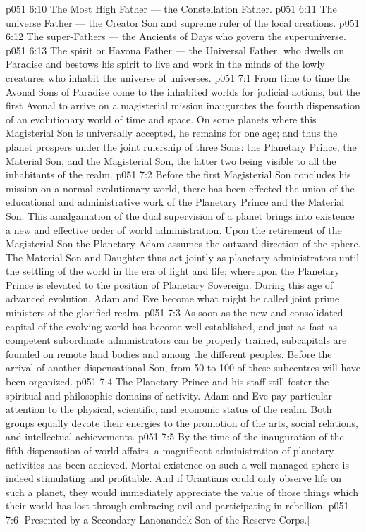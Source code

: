 \vs p051 6:10 \bibnobreakspace The Most High Father --- the Constellation Father.
\vs p051 6:11 \bibnobreakspace The universe Father --- the Creator Son and supreme ruler of the local creations.
\vs p051 6:12 \bibnobreakspace The super\hyp{}Fathers --- the Ancients of Days who govern the superuniverse.
\vs p051 6:13 \bibnobreakspace The spirit or Havona Father --- the Universal Father, who dwells on Paradise and bestows his spirit to live and work in the minds of the lowly creatures who inhabit the universe of universes.
\vs p051 7:1 From time to time the Avonal Sons of Paradise come to the inhabited worlds for judicial actions, but the first Avonal to arrive on a magisterial mission inaugurates the fourth dispensation of an evolutionary world of time and space. On some planets where this Magisterial Son is universally accepted, he remains for one age; and thus the planet prospers under the joint rulership of three Sons: the Planetary Prince, the Material Son, and the Magisterial Son, the latter two being visible to all the inhabitants of the realm.
\vs p051 7:2 Before the first Magisterial Son concludes his mission on a normal evolutionary world, there has been effected the union of the educational and administrative work of the Planetary Prince and the Material Son. This amalgamation of the dual supervision of a planet brings into existence a new and effective order of world administration. Upon the retirement of the Magisterial Son the Planetary Adam assumes the outward direction of the sphere. The Material Son and Daughter thus act jointly as planetary administrators until the settling of the world in the era of light and life; whereupon the Planetary Prince is elevated to the position of Planetary Sovereign. During this age of advanced evolution, Adam and Eve become what might be called joint prime ministers of the glorified realm.
\vs p051 7:3 As soon as the new and consolidated capital of the evolving world has become well established, and just as fast as competent subordinate administrators can be properly trained, subcapitals are founded on remote land bodies and among the different peoples. Before the arrival of another dispensational Son, from 50 to 100 of these subcentres will have been organized.
\vs p051 7:4 The Planetary Prince and his staff still foster the spiritual and philosophic domains of activity. Adam and Eve pay particular attention to the physical, scientific, and economic status of the realm. Both groups equally devote their energies to the promotion of the arts, social relations, and intellectual achievements.
\vs p051 7:5 By the time of the inauguration of the fifth dispensation of world affairs, a magnificent administration of planetary activities has been achieved. Mortal existence on such a well\hyp{}managed sphere is indeed stimulating and profitable. And if Urantians could only observe life on such a planet, they would immediately appreciate the value of those things which their world has lost through embracing evil and participating in rebellion.
\vsetoff
\vs p051 7:6 [Presented by a Secondary Lanonandek Son of the Reserve Corps.]
